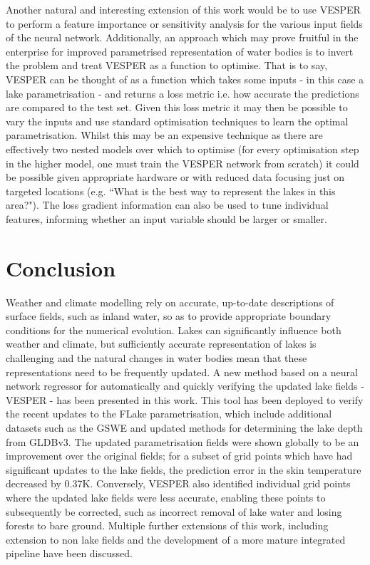 \documentclass[hess, twostagejnl]{copernicus}
\begin{document}
Another natural and interesting extension of this work would be to use VESPER to perform a feature importance or sensitivity analysis for the various input fields of the neural network. Additionally, an approach which may prove fruitful in the enterprise for improved parametrised representation of water bodies is to invert the problem and treat VESPER as a function to optimise. That is to say, VESPER can be thought of as a function which takes some inputs - in this case a lake parametrisation - and returns a loss metric i.e. how accurate the predictions are compared to the test set. Given this loss metric it may then be possible to vary the inputs and use standard optimisation techniques to learn the optimal parametrisation. Whilst this may be an expensive technique as there are effectively two nested models over which to optimise (for every optimisation step in the higher model, one must train the VESPER network from scratch) it could be possible given appropriate hardware or with reduced data focusing just on targeted locations (e.g. “What is the best way to represent the lakes in this area?"). The loss gradient information can also be used to tune individual features, informing whether an input variable should be larger or smaller.




\section{Conclusion}\label{sec:conclusion}
Weather and climate modelling rely on accurate, up-to-date descriptions of surface fields, such as inland water, so as to provide appropriate boundary conditions for the numerical evolution. Lakes can significantly influence both weather and climate, but sufficiently  accurate  representation  of  lakes  is  challenging  and  the  natural  changes  in  water  bodies  mean  that  these representations  need  to  be  frequently  updated.  A  new  method  based  on  a  neural  network  regressor  for  automatically  and quickly verifying the updated lake fields - VESPER - has been presented in this work. This tool has been deployed to verify the recent updates to the FLake parametrisation, which include additional datasets such as the GSWE and updated methods for determining the lake depth from GLDBv3. The updated parametrisation fields were shown globally to be an improvement over the original fields; for a subset of grid points which have had significant updates to the lake fields, the prediction error in the skin temperature decreased by 0.37K. Conversely, VESPER also identified individual grid points where the updated lake fields were less accurate, enabling these points to subsequently be corrected, such as incorrect removal of lake water and losing forests to bare ground. Multiple further extensions of this work, including extension to non lake fields and the development of a more mature integrated pipeline have been discussed.
\end{document}
